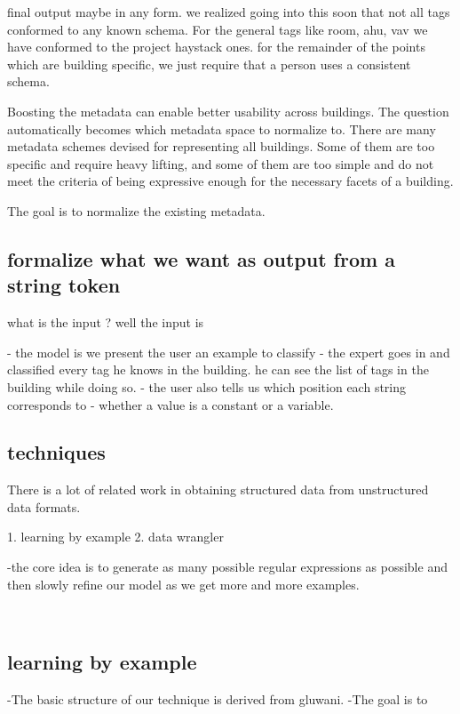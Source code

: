 final output maybe in any form. 
we realized going into this soon that not all tags conformed to any known schema. 
For the general tags like room, ahu, vav we have conformed to the project haystack ones. 
for the remainder of the points which are building specific, we just require that a person uses a consistent schema. 


Boosting the metadata can enable better usability across buildings. The question automatically becomes which metadata space to normalize to. There are many metadata schemes devised for representing all buildings. Some of them are too specific and require heavy lifting, and some of them are too simple and do not meet the criteria of being expressive enough for the necessary facets of a building. 


The goal is to normalize the existing metadata. 

\subsection{ formalize what we want as output from a string token}

what is the input ? 
well the input is 



- the model is we present the user an example to classify
- the expert goes in and classified every tag he knows in the building. he can see the list of tags in the building while doing so. 
- the user also tells us which position each string corresponds to 
- whether a value is a constant or a variable.

\subsection{techniques}

There is a lot of related work in obtaining structured data from unstructured data formats. 

1. learning by example
2. data wrangler

-the core idea is to generate as many possible regular expressions as possible and then slowly refine our model as we get more and more examples.


\
\subsection{learning by example}

-The basic structure of our technique is derived from gluwani.
-The goal is to 

